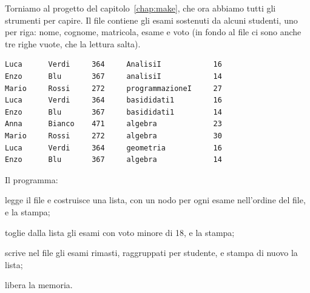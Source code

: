 Torniamo al progetto del capitolo~\ref{chap:make}, che ora abbiamo tutti gli
strumenti per capire. Il file  contiene gli esami sostenuti da
alcuni studenti, uno per riga: nome, cognome, matricola, esame e voto (in
fondo al file ci sono anche tre righe vuote, che la lettura salta).

\begin{affianco}[0.55][c]
\begin{lstlisting}[style=plain, name=dati.txt]
Luca      Verdi     364     AnalisiI            16
Enzo      Blu       367     analisiI            14
Mario     Rossi     272     programmazioneI     27
Luca      Verdi     364     basididati1         16
Enzo      Blu       367     basididati1         14
Anna      Bianco    471     algebra             23
Mario     Rossi     272     algebra             30
Luca      Verdi     364     geometria           16
Enzo      Blu       367     algebra             14
\end{lstlisting}
\risultato
Il programma:
\begin{passi}
  \item legge il file e costruisce una lista, con un nodo per ogni esame
        nell'ordine del file, e la stampa;
  \item toglie dalla lista gli esami con voto minore di 18, e la stampa;
  \item scrive nel file  gli esami rimasti, raggruppati per
        studente, e stampa di nuovo la lista;
  \item libera la memoria.
\end{passi}
\end{affianco}

\subsection{}

